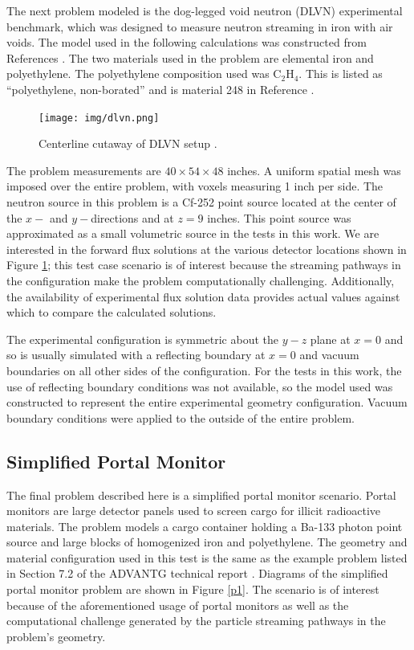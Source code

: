 \documentclass{article} %
\begin{document}
The next problem modeled is the dog-legged void neutron (DLVN) experimental 
benchmark, which was designed to measure neutron streaming in iron with air
voids. The model used in the following calculations was constructed from
References \cite{sw-dlvn,j-dlvn,dlvn1991}. The two materials used in the
problem are elemental iron and polyethylene. The polyethylene composition used
was C$_2$H$_4$. This is listed as ``polyethylene, non-borated'' and is material
248 in Reference \cite{pnnl}. 

\begin{figure}[!htb]
\centering
\texttt{[image: img/dlvn.png]}
\caption{Centerline cutaway of DLVN setup \cite{sw-dlvn}.}
\label{dlvn}
\end{figure}

The problem measurements are $40\times54\times48$ inches. A uniform spatial
mesh was imposed over the entire problem, with voxels measuring 1 inch per side.
The neutron source in this problem is a Cf-252 point source located at the 
center of the $x-$ and $y-$directions and at $z = 9$ inches.
This point source was approximated as a small volumetric source in the tests in
this work. We are interested in the forward flux solutions at the various detector
locations shown in Figure \ref{dlvn}; this test case scenario is of interest 
because the streaming pathways in the configuration make the problem computationally
challenging. Additionally, the availability of experimental flux solution data
provides actual values against which to compare the calculated solutions.

The experimental configuration is symmetric about the $y-z$ plane at $x = 0$
and so is usually simulated with a reflecting boundary at $x = 0$ and vacuum
boundaries on all other sides of the configuration. For the tests in this work,
the use of reflecting boundary conditions was not available, so the model used 
was constructed to represent the entire experimental geometry configuration.
Vacuum boundary conditions were applied to the outside of the entire problem.

\subsection{Simplified Portal Monitor}

The final problem described here is a simplified portal monitor scenario.
Portal monitors are large detector panels used to screen cargo for illicit
radioactive materials. The problem models a cargo container holding a Ba-133
photon point source and large blocks of homogenized iron and polyethylene.
The geometry and material configuration used in this test is the same as the
example problem listed in Section 7.2 of the ADVANTG technical report
\cite{advantg}. Diagrams of the simplified portal monitor problem are shown in
Figure \ref{p1}. The scenario is of interest because of the aforementioned
usage of portal monitors as well as the computational challenge generated by
the particle streaming pathways in the problem's geometry.
\end{document}
